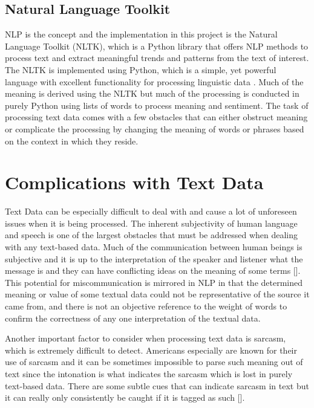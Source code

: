 \subsection{Natural Language Toolkit}
NLP is the concept and the implementation in this project is the Natural Language Toolkit (NLTK), which is a Python library that offers NLP methods to process text and extract meaningful trends and patterns from the text of interest.
The NLTK is implemented using Python, which is a simple, yet powerful language with excellent functionality for processing linguistic data \cite{bird2004nltk}.
Much of the meaning is derived using the NLTK but much of the processing is conducted in purely Python using lists of words to process meaning and sentiment.
The task of processing text data comes with a few obstacles that can either obstruct meaning or complicate the processing by changing the meaning of words or phrases based on the context in which they reside.

\section{Complications with Text Data}
Text Data can be especially difficult to deal with and cause a lot of unforeseen issues when it is being processed.
The inherent subjectivity of human language and speech is one of the largest obstacles that must be addressed when dealing with any text-based data.
Much of the communication between human beings is subjective and it is up to the interpretation of the speaker and listener what the message is and they can have conflicting ideas on the meaning of some terms [\cite{aggarwal2012mining}].
This potential for miscommunication is mirrored in NLP in that the determined meaning or value of some textual data could not be representative of the source it came from, and there is not an objective reference to the weight of words to confirm the correctness of any one interpretation of the textual data.

Another important factor to consider when processing text data is sarcasm, which is extremely difficult to detect.
Americans especially are known for their use of sarcasm and it can be sometimes impossible to parse such meaning out of text since the intonation is what indicates the sarcasm which is lost in purely text-based data.
There are some subtle cues that can indicate sarcasm in text but it can really only consistently be caught if it is tagged as such [\cite{riloff2013sarcasm}].

